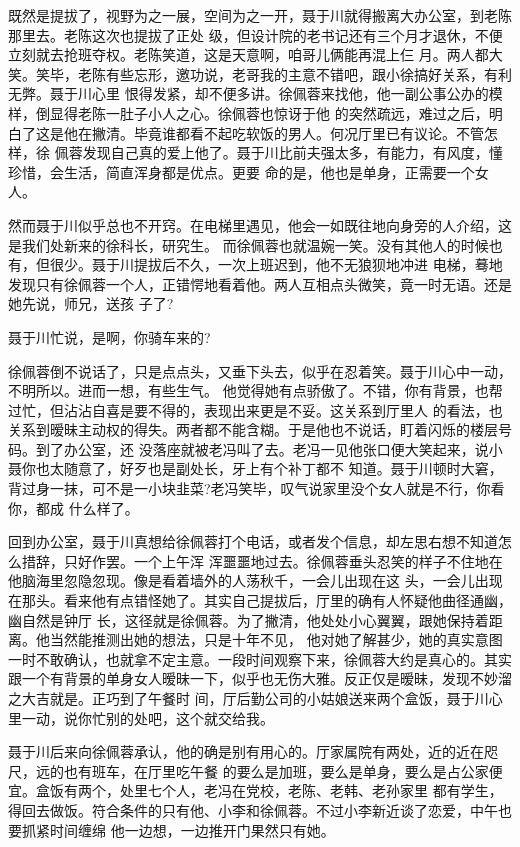 \documentclass[11pt,a4paper,onecolumn]{article}
\begin{document}
既然是提拔了，视野为之一展，空间为之一开，聂于川就得搬离大办公室，到老陈那里去。老陈这次也提拔了正处
级，但设计院的老书记还有三个月才退休，不便立刻就去抢班夺权。老陈笑道，这是天意啊，咱哥儿俩能再混上仨
月。两人都大笑。笑毕，老陈有些忘形，邀功说，老哥我的主意不错吧，跟小徐搞好关系，有利无弊。聂于川心里
恨得发紧，却不便多讲。徐佩蓉来找他，他一副公事公办的模样，倒显得老陈一肚子小人之心。徐佩蓉也惊讶于他
的突然疏远，难过之后，明白了这是他在撇清。毕竟谁都看不起吃软饭的男人。何况厅里已有议论。不管怎样，徐
佩蓉发现自己真的爱上他了。聂于川比前夫强太多，有能力，有风度，懂珍惜，会生活，简直浑身都是优点。更要
命的是，他也是单身，正需要一个女人。

然而聂于川似乎总也不开窍。在电梯里遇见，他会一如既往地向身旁的人介绍，这是我们处新来的徐科长，研究生。
而徐佩蓉也就温婉一笑。没有其他人的时候也有，但很少。聂于川提拔后不久，一次上班迟到，他不无狼狈地冲进
电梯，蓦地发现只有徐佩蓉一个人，正错愕地看着他。两人互相点头微笑，竟一时无语。还是她先说，师兄，送孩
子了?

聂于川忙说，是啊，你骑车来的?

徐佩蓉倒不说话了，只是点点头，又垂下头去，似乎在忍着笑。聂于川心中一动，不明所以。进而一想，有些生气。
他觉得她有点骄傲了。不错，你有背景，也帮过忙，但沾沾自喜是要不得的，表现出来更是不妥。这关系到厅里人
的看法，也关系到暧昧主动权的得失。两者都不能含糊。于是他也不说话，盯着闪烁的楼层号码。到了办公室，还
没落座就被老冯叫了去。老冯一见他张口便大笑起来，说小聂你也太随意了，好歹也是副处长，牙上有个补丁都不
知道。聂于川顿时大窘，背过身一抹，可不是一小块韭菜?老冯笑毕，叹气说家里没个女人就是不行，你看你，都成
什么样了。

回到办公室，聂于川真想给徐佩蓉打个电话，或者发个信息，却左思右想不知道怎么措辞，只好作罢。一个上午浑
浑噩噩地过去。徐佩蓉垂头忍笑的样子不住地在他脑海里忽隐忽现。像是看着墙外的人荡秋千，一会儿出现在这
头，一会儿出现在那头。看来他有点错怪她了。其实自己提拔后，厅里的确有人怀疑他曲径通幽，幽自然是钟厅
长，这径就是徐佩蓉。为了撇清，他处处小心翼翼，跟她保持着距离。他当然能推测出她的想法，只是十年不见，
他对她了解甚少，她的真实意图一时不敢确认，也就拿不定主意。一段时间观察下来，徐佩蓉大约是真心的。其实
跟一个有背景的单身女人暧昧一下，似乎也无伤大雅。反正仅是暧昧，发现不妙溜之大吉就是。正巧到了午餐时
间，厅后勤公司的小姑娘送来两个盒饭，聂于川心里一动，说你忙别的处吧，这个就交给我。

聂于川后来向徐佩蓉承认，他的确是别有用心的。厅家属院有两处，近的近在咫尺，远的也有班车，在厅里吃午餐
的要么是加班，要么是单身，要么是占公家便宜。盒饭有两个，处里七个人，老冯在党校，老陈、老韩、老孙家里
都有学生，得回去做饭。符合条件的只有他、小李和徐佩蓉。不过小李新近谈了恋爱，中午也要抓紧时间缠绵
\myrule{}他一边想，一边推开门\myrule{}果然只有她。
\end{document}
